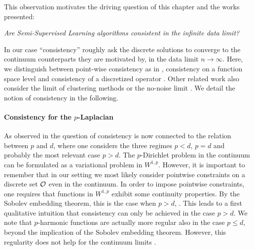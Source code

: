 %
%
\noindent%
This observation motivates the driving question of this chapter and the works presented:
%
\begin{center}
\textit{%
Are Semi-Supervised Learning algorithms consistent in the infinite data limit?}
\end{center}
%
In our case \enquote{consistency} roughly ask the discrete solutions to converge to the continuum counterparts they are motivated by, in the data limit $n\to\infty$. Here, we distinguish between point-wise consistency as in \cite{von2008consistency, gine2006empirical, hein2005graphs}, consistency on a function space level \cite{slepcev2019analysis, GarcSlep15,calder2019consistency, roith2022continuum, bungert2021uniform} and consistency of a discretized operator \cite{calder2019consistency, bungert2022ratio}. Other related work also consider the limit of clustering methods \cite{hoffmann2022spectral, trillos2018variational} or the no-noise limit \cite{hoffmann2020consistency, dunlop2020large}. We detail the notion of consistency in the following.  
%
%
\paragraph{Consistency for the $p$-Laplacian} 
As observed in \cite{nadler2009statistical, alamgir2011phase, el2016asymptotic, calder2020properly} the question of consistency is now connected to the relation between $p$ and $d$, where one considers the three regimes $p<d$, $p=d$ and probably the most relevant case $p>d$. The $p$-Dirichlet problem in the continuum can be formulated as a variational problem in $W^{1,p}$. However, it is important to remember that in our setting we most likely consider pointwise constraints on a discrete set $\mathcal{O}$ even in the continuum. In order to impose pointwise constraints, one requires that functions in $W^{1,p}$ exhibit some continuity properties. By the Sobolev embedding theorem, this is the case when $p>d$, \cite{adams2003sobolev}. This leads to a first qualitative intuition that consistency can only be achieved in the case $p>d$. We note that $p$-harmonic functions are actually more regular also in the case $p\leq d$, beyond the implication of the Sobolev embedding theorem. However, this regularity does not help for the continuum limits \cite{nadler2009statistical, alamgir2011phase, el2016asymptotic}.

